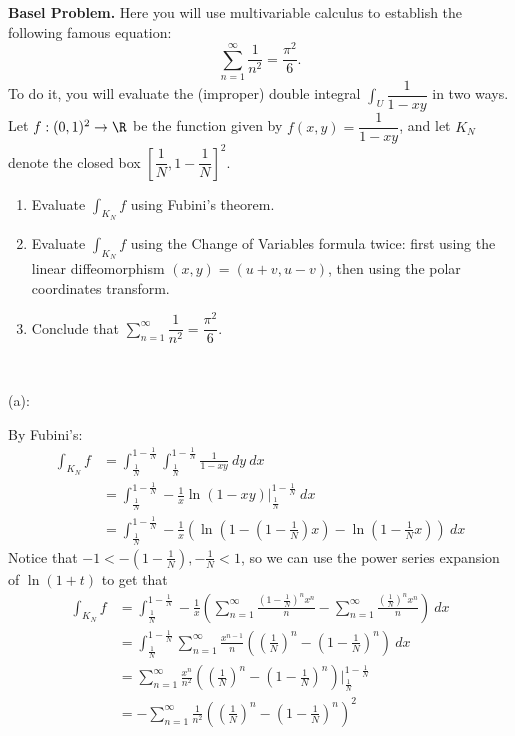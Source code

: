 \documentclass{../../../tex-setup/eh-homework}
\begin{document}
    \begin{question}{38}
        \textbf{Basel Problem.} Here you will use multivariable calculus to establish the following famous equation:
        \[ \sum_{n=1}^\infty \dfrac{1}{n^2} = \dfrac{\pi^2}6. \]
        To do it, you will evaluate the (improper) double integral $\displaystyle \int_U \dfrac{1}{1-xy}$ in two ways. Let $f:(0,1)^2\rightarrow \R$ be the function given by $f(x,y)=\dfrac{1}{1-xy}$, and let $K_N$ denote the closed box $\left[\dfrac{1}N,1-\dfrac{1}{N}\right]^2$.
        \begin{enumerate}[label=(\alph*)]
            \item Evaluate $\displaystyle\int_{K_N} f$ using Fubini's theorem.

            \item Evaluate $\displaystyle\int_{K_N} f$ using the Change of Variables formula twice: first using the linear diffeomorphism $(x,y)=(u+v,u-v)$, then using the polar coordinates transform.

            \item Conclude that $\sum_{n=1}^\infty \dfrac{1}{n^2} = \dfrac{\pi^2}6$.
        \end{enumerate}
    \tcblower
    \ 

    (a):

    By Fubini's:
    \begin{align*}
        \int _{K_N} f &= \int _{\frac{1}{N}}^{1-\frac{1}{N}}\int _{\frac{1}{N}}^{1-\frac{1}{N}} \frac{1}{1-xy}\ dy\ dx \\
        &= \int _{\frac{1}{N}}^{1-\frac{1}{N}} -\frac{1}{x}\ln (1 - xy) \Big| _{\frac{1}{N}}^{1-\frac{1}{N}}\ dx \\
        &= \int _{\frac{1}{N}}^{1-\frac{1}{N}} -\frac{1}{x}\left( \ln \left( 1 - \left(1-\frac{1}{N}\right)x \right) - \ln \left( 1 - \frac{1}{N}x \right) \right)\ dx
    \end{align*}
    Notice that \(-1 < -\left( 1-\frac{1}{N} \right),-\frac{1}{N} < 1\), so we can use the power series expansion of \(\ln (1+t)\) to get that
    \begin{align*}
        \int _{K_N} f &= \int _{\frac{1}{N}}^{1-\frac{1}{N}} -\frac{1}{x}\left( \sum_{n=1}^{\infty} \frac{\left( 1-\frac{1}{N}\right)^n x^n}{n} - \sum_{n=1}^{\infty} \frac{\left( \frac{1}{N} \right)^n x^n}{n}\right)\ dx \\
        &= \int _{\frac{1}{N}}^{1-\frac{1}{N}}\sum_{n=1}^{\infty} \frac{x^{n-1}}{n} \left( \left( \frac{1}{N} \right)^n - \left( 1 - \frac{1}{N} \right)^n \right)\ dx \\
        &= \sum_{n=1}^{\infty} \frac{x^n}{n^2}\left( \left( \frac{1}{N} \right)^n - \left( 1 - \frac{1}{N} \right)^n \right) \Bigg| _{\frac{1}{N}}^{1-\frac{1}{N}} \\
        &= -\sum_{n=1}^{\infty} \frac{1}{n^2} \left( \left( \frac{1}{N} \right)^n - \left( 1 - \frac{1}{N} \right)^n \right)^2
    \end{align*}
    \medskip


\end{question}
\end{document}
